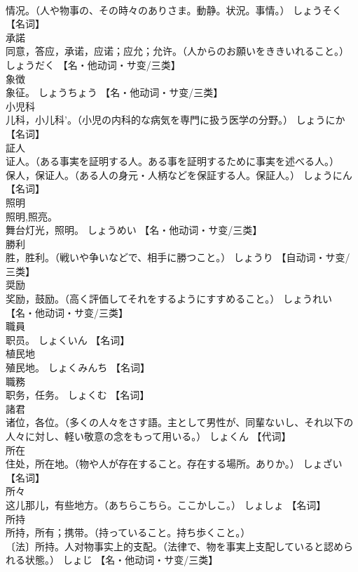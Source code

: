 \documentclass[8pt]{extreport}
\begin{document}
\begin{CJK}{UTF8}{min}
\\	情况。（人や物事の、その時々のありさま。動静。状況。事情。）	しょうそく		【名词】
\\	承諾	
\\	同意，答应，承诺，应诺；应允；允许。（人からのお願いをききいれること。）	しょうだく		【名・他动词・サ变/三类】
\\	象徴	
\\	象征。	しょうちょう		【名・他动词・サ变/三类】
\\	小児科	
\\	儿科，小儿科'。（小児の内科的な病気を専門に扱う医学の分野。）	しょうにか		【名词】
\\	証人	
\\	证人。（ある事実を証明する人。ある事を証明するために事実を述べる人。） 
\\	保人，保证人。（ある人の身元・人柄などを保証する人。保証人。）	しょうにん		【名词】
\\	照明	
\\	照明,照亮。 
\\	舞台灯光，照明。	しょうめい		【名・他动词・サ变/三类】
\\	勝利	
\\	胜，胜利。（戦いや争いなどで、相手に勝つこと。）	しょうり		【自动词・サ变/三类】
\\	奨励	
\\	奖励，鼓励。（高く評価してそれをするようにすすめること。）	しょうれい		【名・他动词・サ变/三类】
\\	職員	
\\	职员。	しょくいん		【名词】
\\	植民地	
\\	殖民地。	しょくみんち		【名词】
\\	職務	
\\	职务，任务。	しょくむ		【名词】
\\	諸君	
\\	诸位，各位。（多くの人々をさす語。主として男性が、同輩ないし、それ以下の人々に対し、軽い敬意の念をもって用いる。）	しょくん		【代词】
\\	所在	
\\	住处，所在地。（物や人が存在すること。存在する場所。ありか。）	しょざい		【名词】
\\	所々	
\\	这儿那儿，有些地方。（あちらこちら。ここかしこ。）	しょしょ		【名词】
\\	所持	
\\	所持，所有；携带。（持っていること。持ち歩くこと。） 
\\	〔法〕所持。人对物事实上的支配。（法律で、物を事実上支配していると認められる状態。）	しょじ		【名・他动词・サ变/三类】

\end{CJK}
\end{document}

